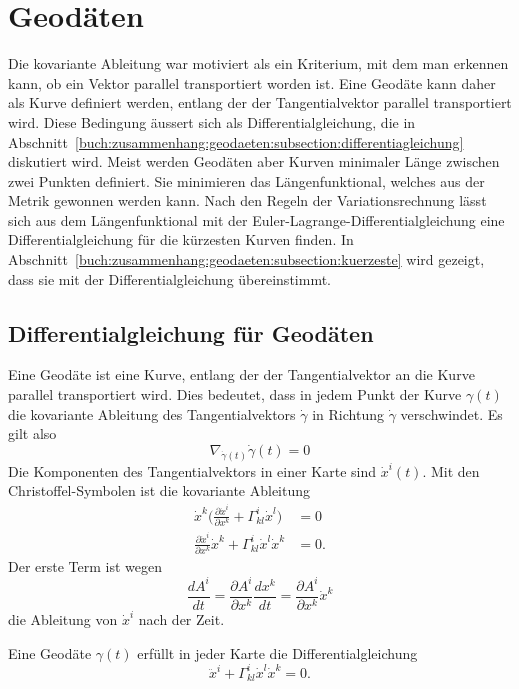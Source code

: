 %
%
%

%
%
\section{Geodäten
\label{buch:zusammenhang:section:geodaeten}}
Die kovariante Ableitung war motiviert als ein Kriterium, mit
dem man erkennen kann, ob ein Vektor parallel transportiert
worden ist.
Eine Geodäte kann daher als Kurve definiert werden, entlang der
der Tangentialvektor parallel transportiert wird.
Diese Bedingung äussert sich als Differentialgleichung, die in
Abschnitt~\ref{buch:zusammenhang:geodaeten:subsection:differentiagleichung}
diskutiert wird.
Meist werden Geodäten aber Kurven minimaler Länge zwischen zwei Punkten
definiert.
Sie minimieren das Längenfunktional, welches aus der Metrik gewonnen
werden kann.
Nach den Regeln der Variationsrechnung lässt sich aus dem Längenfunktional
mit der Euler-Lagrange-Differentialgleichung eine Differentialgleichung
für die kürzesten Kurven finden.
In Abschnitt~\ref{buch:zusammenhang:geodaeten:subsection:kuerzeste}
wird gezeigt, dass sie mit der Differentialgleichung übereinstimmt.

%
%
\subsection{Differentialgleichung für Geodäten
\label{buch:zusammenhang:geodaeten:subsection:differentialgleichung}}
Eine Geodäte ist eine Kurve, entlang der der Tangentialvektor an die
Kurve parallel transportiert wird.
Dies bedeutet, dass in jedem Punkt der Kurve $\gamma(t)$ die kovariante
Ableitung des Tangentialvektors $\dot{\gamma}$ in Richtung
$\dot{\gamma}$ verschwindet.
Es gilt also
\[
\nabla_{\dot{\gamma}(t)} \dot{\gamma}(t)
=
0
\]
Die Komponenten des Tangentialvektors in einer Karte sind $\dot{x}^i(t)$.
Mit den Christoffel-Symbolen ist die kovariante Ableitung
\begin{align*}
\dot{x}^k
\biggl(
\frac{\partial\dot{x}^i}{\partial x^k}
+
\Gamma^i_{kl}\dot{x}^l
\biggr)
&=
0
\\
\frac{\partial\dot{x}^i}{\partial x^k}
\dot{x}^k
+
\Gamma^i_{kl} \dot{x}^l \dot{x}^k
&=
0.
\end{align*}
Der erste Term ist wegen
\[
\frac{dA^i}{dt}
=
\frac{\partial A^i}{\partial x^k}\frac{dx^k}{dt}
=
\frac{\partial A^i}{\partial x^k}
\dot{x}^k
\]
die Ableitung von $\dot{x}^i$ nach der Zeit.

\begin{satz}
Eine Geodäte $\gamma(t)$ erfüllt in jeder Karte die Differentialgleichung
\begin{equation}
\ddot{x}^i
+
\Gamma^i_{kl} \dot{x}^l \dot{x}^k
=
0.
\label{buch:zusammenhang:geodaeten:eqn:dgl}
\end{equation}
\end{satz}


